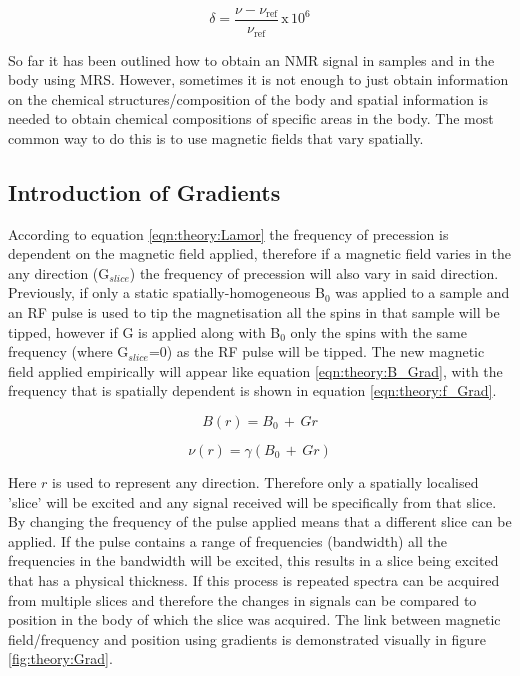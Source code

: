 \documentclass[class=article, crop=false]{standalone}
\begin{document}
\begin{equation}
    \delta = \frac{\nu - \nu_{\textrm{ref}}}{\nu_\textrm{ref}} \, \textrm{x} \, 10^6
    \label{eqn:theory:chemshift}
\end{equation}

So far it has been outlined how to obtain an NMR signal in samples and in the body using MRS. However, sometimes it is not enough to just obtain information on the chemical structures/composition of the body and spatial information is needed to obtain chemical compositions of specific areas in the body. The most common way to do this is to use magnetic fields that vary spatially\cite{Haacke2014MagneticDesign}. 

\subsection{Introduction of Gradients}

According to equation \ref{eqn:theory:Lamor} the frequency of precession is dependent on the magnetic field applied, therefore if a magnetic field varies in the any direction (G$_{slice}$) the frequency of precession will also vary in said direction. Previously, if only a static spatially-homogeneous B$_0$ was applied to a sample and an RF pulse is used to tip the magnetisation all the spins in that sample will be tipped, however if G is applied along with B$_0$ only the spins with the same frequency (where G$_{slice}$=0) as the RF pulse will be tipped. The new magnetic field applied empirically will appear like equation \ref{eqn:theory:B_Grad}, with the frequency that is spatially dependent is shown in equation \ref{eqn:theory:f_Grad}.

\begin{equation}
    B(r) = B_0 \, + \, Gr
    \label{eqn:theory:B_Grad}
\end{equation}

\begin{equation}
    \nu(r) = \gamma(B_0 \, + \, Gr)
    \label{eqn:theory:f_Grad}
\end{equation}

Here $r$ is used to represent any direction. Therefore only a spatially localised 'slice' will be excited and any signal received will be specifically from that slice. By changing the frequency of the pulse applied means that a different slice can be applied. If the pulse contains a range of frequencies (bandwidth) all the frequencies in the bandwidth will be excited, this results in a slice being excited that has a physical thickness. If this process is repeated spectra can be acquired from multiple slices and therefore the changes in signals can be compared to position in the body of which the slice was acquired. The link between magnetic field/frequency and position using gradients is demonstrated visually in figure \ref{fig:theory:Grad}.
\end{document}
